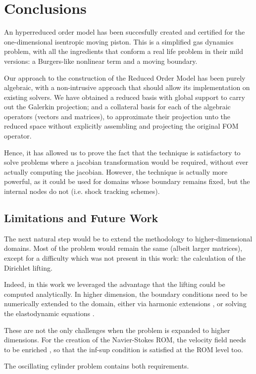 \documentclass[thesis.tex]{subfiles}
\begin{document}
\section{Conclusions}
An hyperreduced order model has been succesfully created and certified for
the one-dimensional isentropic moving piston.
This is a simplified gas dynamics problem, 
with all the ingredients that conform a real life problem in their mild versions:
a Burgers-like nonlinear term and a moving boundary.

Our approach to the construction of the Reduced Order Model has been purely algebraic, 
with a non-intrusive approach that should allow its implementation on existing solvers.
We have obtained a reduced basis with global support to carry out the Galerkin projection;
and a collateral basis for each of the algebraic operators (vectors and matrices),
to approximate their projection unto the reduced space 
without explicitly assembling and projecting the original FOM operator.

Hence, it has allowed us to prove the fact that the technique is satisfactory
to solve problems where a jacobian transformation would be required,
without ever actually computing the jacobian. 
However, the technique is actually more powerful, 
as it could be used for domains whose boundary remains fixed,
but the internal nodes do not (i.e. shock tracking schemes).

\subsection{Limitations and Future Work}
The next natural step would be to extend the methodology to higher-dimensional domains.
Most of the problem would remain the same (albeit larger matrices), except for a difficulty 
which was not present in this work: the calculation of the Dirichlet lifting. 

Indeed, in this work we leveraged the advantage that the lifting could be computed analytically.
In higher dimension, the boundary conditions need to be numerically extended to the domain,
either via harmonic extensions
\cite{formaggiaALE},
or solving the elastodynamic equations
\cite{1995_farhat_elasticEquations}.

These are not the only challenges when the problem is expanded to higher dimensions.
For the creation of the Navier-Stokes ROM, the velocity field needs to be enriched
\cite{supremizers},
so that the inf-sup condition is satisfied at the ROM level too.

The oscillating cylinder problem contains both requirements.
\end{document}
